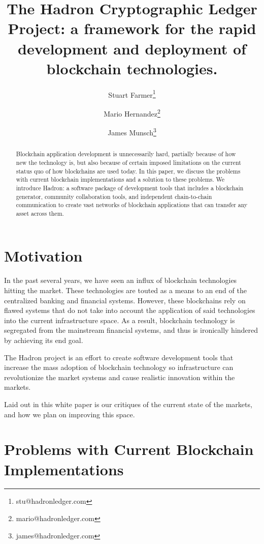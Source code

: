 \documentclass{%
	article}
\title{The Hadron Cryptographic Ledger Project: a framework for the rapid development and deployment of blockchain technologies.}
\author{Stuart Farmer\thanks{stu@hadronledger.com}}
\author{Mario Hernandez\thanks{mario@hadronledger.com}}
\author{James Munsch\thanks{james@hadronledger.com}}
\affil{The Hadron Project, whitepaper version 0.1}
\begin{document}
\sloppy

\begin{titlingpage}
    \maketitle
    \begin{abstract}
        Blockchain application development is unnecessarily hard, partially because of how new the technology is, but also because of certain imposed limitations on the current status quo of how blockchains are used today. In this paper, we discuss the problems with current blockchain implementations and a solution to these problems. We introduce Hadron: a software package of development tools that includes a blockchain generator, community collaboration tools, and independent chain-to-chain communication to create vast networks of blockchain applications that can transfer any asset across them.
    \end{abstract}
\end{titlingpage}

\section{Motivation}

In the past several years, we have seen an influx of blockchain technologies hitting the market. These technologies are touted as a means to an end of the centralized banking and financial systems. However, these blockchains rely on flawed systems that do not take into account the application of said technologies into the current infrastructure space. As a result, blockchain technology is segregated from the mainstream financial systems, and thus is ironically hindered by achieving its end goal.

The Hadron project is an effort to create software development tools that increase the mass adoption of blockchain technology so infrastructure can revolutionize the market systems and cause realistic innovation within the markets.

Laid out in this white paper is our critiques of the current state of the markets, and how we plan on improving this space.

\section{Problems with Current Blockchain\\ Implementations}
\end{document}
